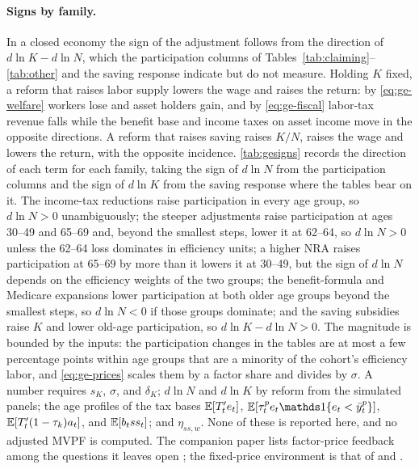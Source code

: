 \paragraph{Signs by family.}
In a closed economy the sign of the adjustment follows from the direction of $d\ln K-d\ln N$, which the participation columns of Tables~\ref{tab:claiming}--\ref{tab:other} and the saving response indicate but do not measure. Holding $K$ fixed, a reform that raises labor supply lowers the wage and raises the return: by \eqref{eq:ge-welfare} workers lose and asset holders gain, and by \eqref{eq:ge-fiscal} labor-tax revenue falls while the benefit base and income taxes on asset income move in the opposite directions. A reform that raises saving raises $K/N$, raises the wage and lowers the return, with the opposite incidence. \autoref{tab:gesigns} records the direction of each term for each family, taking the sign of $d\ln N$ from the participation columns and the sign of $d\ln K$ from the saving response where the tables bear on it. The income-tax reductions raise participation in every age group, so $d\ln N>0$ unambiguously; the steeper adjustments raise participation at ages 30--49 and 65--69 and, beyond the smallest steps, lower it at 62--64, so $d\ln N>0$ unless the 62--64 loss dominates in efficiency units; a higher NRA raises participation at 65--69 by more than it lowers it at 30--49, but the sign of $d\ln N$ depends on the efficiency weights of the two groups; the benefit-formula and Medicare expansions lower participation at both older age groups beyond the smallest steps, so $d\ln N<0$ if those groups dominate; and the saving subsidies raise $K$ and lower old-age participation, so $d\ln K-d\ln N>0$.
The magnitude is bounded by the inputs: the participation changes in the tables are at most a few percentage points within age groups that are a minority of the cohort's efficiency labor, and \eqref{eq:ge-prices} scales them by a factor share and divides by $\sigma$. A number requires $s_K$, $\sigma$, and $\delta_K$; $d\ln N$ and $d\ln K$ by reform from the simulated panels; the age profiles of the tax bases ${\mathbb E}[T'_te_t]$, $\E[\tau^{p}_te_t\ind{e_t<\bar y^{p}_t}]$, ${\mathbb E}[T'_t(1-\tau_k)a_t]$, and ${\mathbb E}[b_tss_t]$; and $\eta_{ss,w}$. None of these is reported here, and no adjusted MVPF is computed. The companion paper lists factor-price feedback among the questions it leaves open \citep{ndiaye2026flexible}; the fixed-price environment is that of \citet{farhi2013insurance} and \citet{golosov2016redistribution}.

